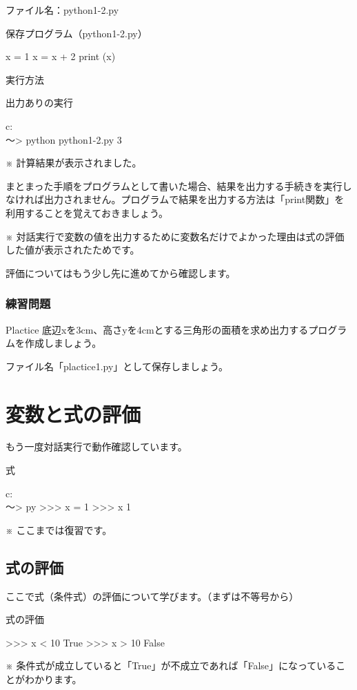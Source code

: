 \documentclass[11pt,a4paper,dvipdfmx,titlepage]{jsreport}
\begin{document}
ファイル名：python1-2.py
\begin{grabox}{保存プログラム（python1-2.py）}
\begin{listing}{1}
x = 1
x = x + 2
print (x)
\end{listing}
\end{grabox}

実行方法
\begin{grabox}{出力ありの実行}
\begin{listing}{1}
c:\\～> python python1-2.py
3
\end{listing}
\end{grabox}
※ 計算結果が表示されました。


まとまった手順をプログラムとして書いた場合、結果を出力する手続きを実行しなければ出力されません。プログラムで結果を出力する方法は「print関数」を利用することを覚えておきましょう。


※ {\gt 対話実行}で変数の値を出力するために変数名だけでよかった理由は式の評価した値が表示されたためです。

 評価についてはもう少し先に進めてから確認します。

\subsubsection{練習問題}
\begin{plabox}{Plactice}
底辺xを3cm、高さyを4cmとする三角形の面積を求め出力するプログラムを作成しましょう。

ファイル名「plactice1.py」として保存しましょう。
\end{plabox}


\section{変数と式の評価}


もう一度{\gt 対話実行}で動作確認しています。
\begin{grabox}{式}
\begin{listing}{1}
c:\\～> py
>>> x = 1
>>> x
1
\end{listing}
\end{grabox}
※ ここまでは復習です。
\subsection{式の評価}
ここで式（条件式）の評価について学びます。（まずは不等号から）
\begin{grabox}{式の評価}
\begin{listingcont}
>>> x < 10
True
>>> x > 10
False
\end{listingcont}
\end{grabox}
※ 条件式が成立していると「True」が不成立であれば「False」になっていることがわかります。
\end{document}
